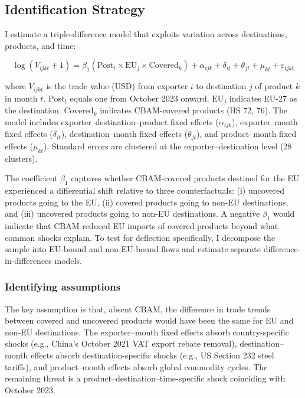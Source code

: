 \documentclass[12pt]{article}
\begin{document}
\subsection{Identification Strategy}

I estimate a triple-difference model that exploits variation across destinations, products, and time:

\begin{equation}
\label{eq:ddd}
\log(V_{ijkt} + 1) = \beta_1 (\text{Post}_t \times \text{EU}_j \times \text{Covered}_k) + \alpha_{ijk} + \delta_{it} + \theta_{jt} + \mu_{kt} + \varepsilon_{ijkt}
\end{equation}

\noindent where $V_{ijkt}$ is the trade value (USD) from exporter $i$ to destination $j$ of product $k$ in month $t$. $\text{Post}_t$ equals one from October 2023 onward. $\text{EU}_j$ indicates EU-27 as the destination. $\text{Covered}_k$ indicates CBAM-covered products (HS 72, 76). The model includes exporter--destination--product fixed effects ($\alpha_{ijk}$), exporter--month fixed effects ($\delta_{it}$), destination--month fixed effects ($\theta_{jt}$), and product--month fixed effects ($\mu_{kt}$). Standard errors are clustered at the exporter--destination level (28 clusters).

The coefficient $\beta_1$ captures whether CBAM-covered products destined for the EU experienced a differential shift relative to three counterfactuals: (i) uncovered products going to the EU, (ii) covered products going to non-EU destinations, and (iii) uncovered products going to non-EU destinations. A negative $\beta_1$ would indicate that CBAM reduced EU imports of covered products beyond what common shocks explain. To test for deflection specifically, I decompose the sample into EU-bound and non-EU-bound flows and estimate separate difference-in-differences models.

\subsubsection*{Identifying assumptions} The key assumption is that, absent CBAM, the difference in trade trends between covered and uncovered products would have been the same for EU and non-EU destinations. The exporter--month fixed effects absorb country-specific shocks (e.g., China's October 2021 VAT export rebate removal), destination--month effects absorb destination-specific shocks (e.g., US Section 232 steel tariffs), and product--month effects absorb global commodity cycles. The remaining threat is a product--destination--time-specific shock coinciding with October 2023.
\end{document}
